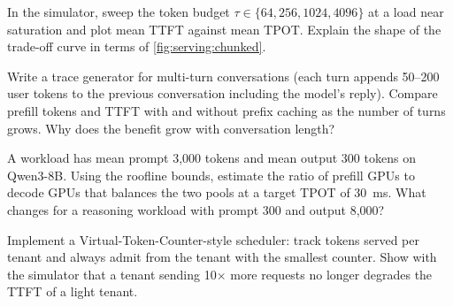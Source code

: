 \begin{exercise}
In the simulator, sweep the token budget $\tau\in\{64,256,1024,4096\}$ at a load near saturation and
plot mean TTFT against mean TPOT. Explain the shape of the trade-off curve in terms of
\cref{fig:serving:chunked}.
\end{exercise}

\begin{exercise}
Write a trace generator for multi-turn conversations (each turn appends 50--200 user tokens to the
previous conversation including the model's reply). Compare prefill tokens and TTFT with and without
prefix caching as the number of turns grows. Why does the benefit grow with conversation length?
\end{exercise}

\begin{exercise}
A workload has mean prompt 3,000 tokens and mean output 300 tokens on Qwen3-8B. Using the roofline
bounds, estimate the ratio of prefill GPUs to decode GPUs that balances the two pools at a target TPOT
of \SI{30}{ms}. What changes for a reasoning workload with prompt 300 and output 8,000?
\end{exercise}

\begin{exercise}[Fairness]
Implement a Virtual-Token-Counter-style scheduler: track tokens served per tenant and always admit from
the tenant with the smallest counter. Show with the simulator that a tenant sending 10$\times$ more
requests no longer degrades the TTFT of a light tenant.
\end{exercise}

